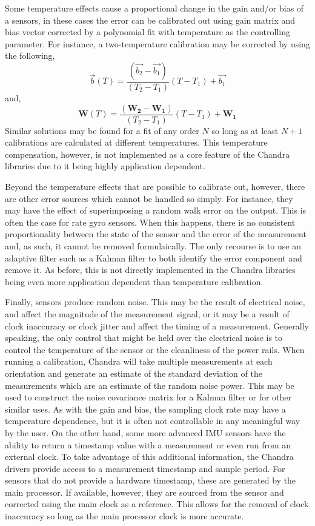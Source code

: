 \documentclass[10pt,letterpaper]{memoir} %
\begin{document}
Some temperature effects cause a proportional change in the gain and/or bias of a sensors, in these cases the error can be calibrated out using gain matrix and bias vector corrected by a polynomial fit with temperature as the controlling parameter.  For instance, a two-temperature calibration may be corrected by using the following,
\begin{equation}
	\vec{b}(T) = \frac{(\vec{b_2}-\vec{b_1})}{(T_2-T_1)}(T - T_1) + \vec{b_1}
\end{equation} 
and,
\begin{equation}
	\mathbf{W}(T) = \frac{(\mathbf{W_2}-\mathbf{W_1})}{(T_2-T_1)}(T - T_1) + \mathbf{W_1}
\end{equation} 
Similar solutions may be found for a fit of any order $N$ so long as at least $N+1$ calibrations are calculated at different temperatures.  This temperature compensation, however, is not implemented as a core feature of the Chandra libraries due to it being highly application dependent.

Beyond the temperature effects that are possible to calibrate out, however, there are other error sources which cannot be handled so simply.  For instance, they may have the effect of superimposing a random walk error on the output.  This is often the case for rate gyro sensors.  When this happens, there is no consistent proportionality between the state of the sensor and the error of the measurement and, as such, it cannot be removed formulaically.  The only recourse is to use an adaptive filter such as a Kalman filter to both identify the error component and remove it.  As before, this is not directly implemented in the Chandra libraries being even more application dependent than temperature calibration.

Finally, sensors produce random noise.  This may be the result of electrical noise, and affect the magnitude of the measurement signal, or it may be a result of clock inaccuracy or clock jitter and affect the timing of a measurement.  Generally speaking, the only control that might be held over the electrical noise is to control the temperature of the sensor or the cleanliness of the power rails.  When running a calibration, Chandra will take multiple measurements at each orientation and generate an estimate of the standard deviation of the measurements which are an estimate of the random noise power.  This may be used to construct the noise covariance matrix for a Kalman filter or for other similar uses.  As with the gain and bias, the sampling clock rate may have a temperature dependence, but it is often not controllable in any meaningful way by the user.  On the other hand, some more advanced IMU sensors have the ability to return a timestamp value with a measurement or even run from an external clock.  To take advantage of this additional information, the Chandra drivers provide access to a measurement timestamp and sample period.  For sensors that do not provide a hardware timestamp, these are generated by the main processor.  If available, however, they are sourced from the sensor and corrected using the main clock as a reference.  This allows for the removal of clock inaccuracy so long as the main processor clock is more accurate.
\end{document}
